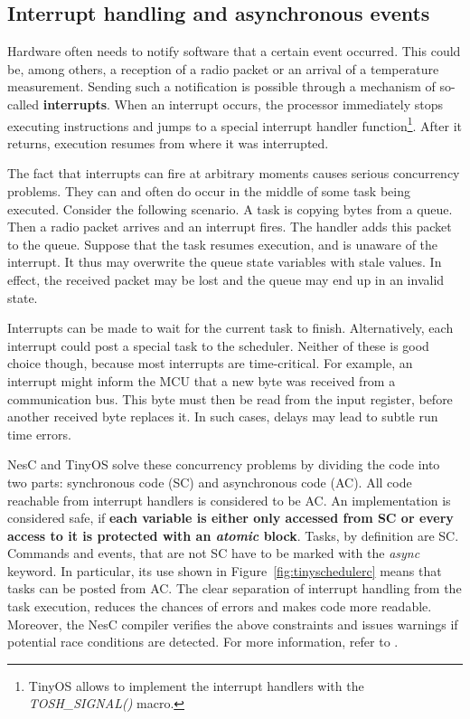 \subsection{Interrupt handling and asynchronous events}
\label{sec:interrupts_and_async}

Hardware often needs to notify software that a certain event occurred. This could be, among others, a reception of a radio packet or an arrival of a temperature measurement. Sending such a notification is possible through a mechanism of so-called {\bf interrupts}. When an interrupt occurs, the processor immediately stops executing instructions and jumps to a special interrupt handler function\footnote{TinyOS allows to implement the interrupt handlers with the \emph{TOSH\_SIGNAL()} macro.}. After it returns, execution resumes from where it was interrupted.

The fact that interrupts can fire at arbitrary moments causes serious concurrency problems. They can and often do occur in the middle of some task being executed.  Consider the following scenario. A task is copying bytes from a queue. Then a radio packet arrives and an interrupt fires. The handler adds this packet to the queue. Suppose that the task resumes execution, and is unaware of the interrupt. It thus may overwrite the queue state variables with stale values. In effect, the received packet may be lost and the queue may end up in an invalid state.

Interrupts can be made to wait for the current task to finish.  Alternatively, each interrupt could post a special task to the scheduler. Neither of these is good choice though, because most interrupts are time-critical. For example, an interrupt might inform the MCU that a new byte was received from a communication bus. This byte must then be read from the input register, before another received byte replaces it. In such cases, delays may lead to subtle run time errors.

NesC and TinyOS solve these concurrency problems by dividing the code into two parts: synchronous code (SC) and asynchronous code (AC).  All code reachable from interrupt handlers is considered to be AC. An implementation is considered safe, if {\bf each variable is either only accessed from SC or every access to it is protected with an \emph{atomic} block}. Tasks, by definition are SC. Commands and events, that are not SC have to be marked with the \emph{async} keyword. In particular, its use shown in Figure~\ref{fig:tinyschedulerc} means that tasks can be posted from AC. The clear separation of interrupt handling from the task execution, reduces the chances of errors and makes code more readable. Moreover, the NesC compiler verifies the above constraints and issues warnings if potential race conditions are detected. For more information, refer to \cite[ch. 8]{NesCMan}.

